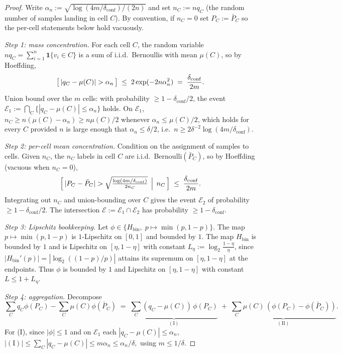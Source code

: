 \documentclass[10pt]{article}
\theoremstyle{definition}
\theoremstyle{remark}
\newcommand{\Hbin}{H_{\mathrm{bin}}}
\let\Pr\relax
\DeclareMathOperator{\Pr}{\mathbb{P}}
\begin{document}
\begin{proof}
Write $\alpha_{n} := \sqrt{\log(4m/\delta_{\mathrm{conf}})/(2n)}$ and
set $n_{C} := n q_{C}$ (the random number of samples landing in
cell $C$). By convention, if $n_{C} = 0$ set $P_{C} := \bar P_{C}$
so the per-cell statements below hold vacuously.

\emph{Step 1: mass concentration.} For each cell $C$, the random
variable $n q_{C} = \sum_{i=1}^{n} \mathbf{1}\{v_{i} \in C\}$ is
a sum of i.i.d.\ Bernoullis with mean $\mu(C)$, so by Hoeffding,
\[
  \Pr\!\bigl[\,|q_{C} - \mu(C)| > \alpha_{n}\,\bigr]
  \;\le\; 2 \exp(-2 n \alpha_{n}^{2})
  \;=\; \frac{\delta_{\mathrm{conf}}}{2m}.
\]
Union bound over the $m$ cells: with probability
$\ge 1 - \delta_{\mathrm{conf}}/2$, the event
$\mathcal{E}_{1} := \bigcap_{C} \{|q_{C} - \mu(C)| \le \alpha_{n}\}$
holds. On $\mathcal{E}_{1}$, $n_{C} \ge n(\mu(C) - \alpha_{n})
\ge n\mu(C)/2$ whenever $\alpha_{n} \le \mu(C)/2$, which holds
for every $C$ provided $n$ is large enough that
$\alpha_{n} \le \delta / 2$, i.e.\
$n \ge 2 \delta^{-2} \log(4m/\delta_{\mathrm{conf}})$.

\emph{Step 2: per-cell mean concentration.} Condition on the
assignment of samples to cells. Given $n_{C}$, the
$n_{C}$ labels in cell $C$ are i.i.d.\ Bernoulli$(\bar P_{C})$,
so by Hoeffding (vacuous when $n_{C} = 0$),
\[
  \Pr\!\Bigl[\,|P_{C} - \bar P_{C}|
    > \sqrt{\tfrac{\log(4m/\delta_{\mathrm{conf}})}{2 n_{C}}}
    \,\Bigm|\, n_{C}\,\Bigr]
  \;\le\; \frac{\delta_{\mathrm{conf}}}{2m}.
\]
Integrating out $n_{C}$ and union-bounding over $C$ gives the
event $\mathcal{E}_{2}$ of probability
$\ge 1 - \delta_{\mathrm{conf}}/2$. The intersection
$\mathcal{E} := \mathcal{E}_{1} \cap \mathcal{E}_{2}$ has
probability $\ge 1 - \delta_{\mathrm{conf}}$.

\emph{Step 3: Lipschitz bookkeeping.} Let
$\phi \in \{\Hbin, \;p \mapsto \min(p, 1-p)\}$. The map
$p \mapsto \min(p, 1-p)$ is $1$-Lipschitz on $[0, 1]$ and
bounded by $1$. The map $\Hbin$ is bounded by $1$ and is
Lipschitz on $[\eta, 1-\eta]$ with constant
$L_{\eta} := \log_{2}\!\tfrac{1-\eta}{\eta}$, since
$|\Hbin'(p)| = |\log_{2}((1-p)/p)|$ attains its supremum on
$[\eta, 1-\eta]$ at the endpoints. Thus $\phi$ is bounded by
$1$ and Lipschitz on $[\eta, 1-\eta]$ with constant
$L \le 1 + L_{\eta}$.

\emph{Step 4: aggregation.} Decompose
\[
  \sum_{C} q_{C}\phi(P_{C}) - \sum_{C} \mu(C)\phi(\bar P_{C})
  \;=\;
  \underbrace{\sum_{C} (q_{C} - \mu(C))\,\phi(P_{C})}_{\mathrm{(I)}}
  \;+\;
  \underbrace{\sum_{C} \mu(C)\,(\phi(P_{C}) - \phi(\bar P_{C}))}_{\mathrm{(II)}}.
\]
For (I), since $|\phi| \le 1$ and on $\mathcal{E}_{1}$ each
$|q_{C} - \mu(C)| \le \alpha_{n}$,
\(
  |\mathrm{(I)}| \le \sum_{C} |q_{C} - \mu(C)|
    \le m\alpha_{n} \le \alpha_{n}/\delta,
\)
using $m \le 1/\delta$.


\end{proof}
\end{document}
